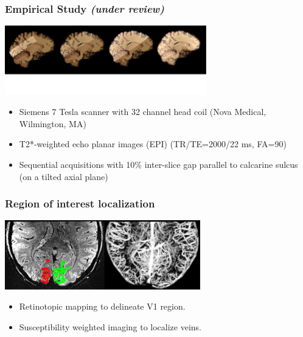 \documentclass{beamer}
\begin{document}
  \begin{frame}
    \frametitle{Empirical Study \textit{(under review)}}
        \begin{center}
            \includegraphics[height=3cm]{../pictures/acquisition}
        \end{center}
        \begin{itemize}
         \item Siemens 7 Tesla scanner with 32 channel head coil (Nova Medical, Wilmington, MA)
         \item T2*-weighted echo planar images (EPI) (TR/TE=2000/22 ms, FA=90\textdegree)
         \item Sequential acquisitions with 10\% inter-slice gap parallel to calcarine sulcus (on a tilted 
         axial plane)
        \end{itemize}  
    \end{frame}  
    
  \begin{frame}
    \frametitle{Region of interest localization}
        \begin{center}
            \includegraphics[height=3cm]{../pictures/ROI}
        \end{center}
                \begin{itemize}
         \item Retinotopic mapping to delineate V1 region.
         \item Susceptibility weighted imaging to localize veins.
        \end{itemize} 
    \end{frame} 
    
\end{document}
